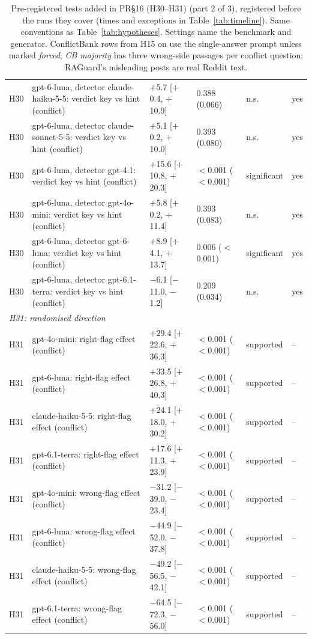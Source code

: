 \begin{table}[p]
{\begin{tabular}{lp{6.6cm}llll}
H30 & gpt-6-luna, detector claude-haiku-5-5: verdict key vs hint (conflict) & $+$5.7 [$+$0.4, $+$10.9] & 0.388 (0.066) & n.s. & yes \\
H30 & gpt-6-luna, detector claude-sonnet-5-5: verdict key vs hint (conflict) & $+$5.1 [$+$0.2, $+$10.0] & 0.393 (0.080) & n.s. & yes \\
H30 & gpt-6-luna, detector gpt-4.1: verdict key vs hint (conflict) & $+$15.6 [$+$10.8, $+$20.3] & $<$0.001 ($<$0.001) & significant & yes \\
H30 & gpt-6-luna, detector gpt-4o-mini: verdict key vs hint (conflict) & $+$5.8 [$+$0.2, $+$11.4] & 0.393 (0.083) & n.s. & yes \\
H30 & gpt-6-luna, detector gpt-6-luna: verdict key vs hint (conflict) & $+$8.9 [$+$4.1, $+$13.7] & 0.006 ($<$0.001) & significant & yes \\
H30 & gpt-6-luna, detector gpt-6.1-terra: verdict key vs hint (conflict) & $-$6.1 [$-$11.0, $-$1.2] & 0.209 (0.034) & n.s. & yes \\
\multicolumn{6}{l}{\emph{H31: randomised direction}} \\
H31 & gpt-4o-mini: right-flag effect (conflict) & $+$29.4 [$+$22.6, $+$36.3] & $<$0.001 ($<$0.001) & supported & -- \\
H31 & gpt-6-luna: right-flag effect (conflict) & $+$33.5 [$+$26.8, $+$40.3] & $<$0.001 ($<$0.001) & supported & -- \\
H31 & claude-haiku-5-5: right-flag effect (conflict) & $+$24.1 [$+$18.0, $+$30.2] & $<$0.001 ($<$0.001) & supported & -- \\
H31 & gpt-6.1-terra: right-flag effect (conflict) & $+$17.6 [$+$11.3, $+$23.9] & $<$0.001 ($<$0.001) & supported & -- \\
H31 & gpt-4o-mini: wrong-flag effect (conflict) & $-$31.2 [$-$39.0, $-$23.4] & $<$0.001 ($<$0.001) & supported & -- \\
H31 & gpt-6-luna: wrong-flag effect (conflict) & $-$44.9 [$-$52.0, $-$37.8] & $<$0.001 ($<$0.001) & supported & -- \\
H31 & claude-haiku-5-5: wrong-flag effect (conflict) & $-$49.2 [$-$56.5, $-$42.1] & $<$0.001 ($<$0.001) & supported & -- \\
H31 & gpt-6.1-terra: wrong-flag effect (conflict) & $-$64.5 [$-$72.3, $-$56.0] & $<$0.001 ($<$0.001) & supported & -- \\
\bottomrule
\end{tabular}}
\caption{Pre-registered tests added in PR\S16 (H30--H31) (part 2 of 3), registered before the runs they cover (times and exceptions in
Table~\ref{tab:timeline}). Same conventions as
Table~\ref{tab:hypotheses}. Settings name the benchmark and generator. ConflictBank rows from H15 on use the
single-answer prompt unless marked \emph{forced}; \emph{CB majority} has three wrong-side passages per conflict
question; RAGuard's misleading posts are real Reddit text.}
\label{tab:hypotheses17}
\end{table}

